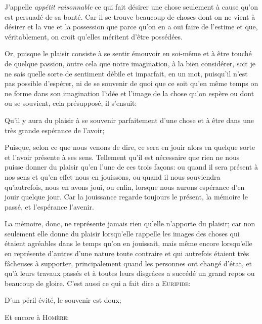 J'appelle \emph{appétit raisonnable} ce qui fait désirer une chose seulement à cause qu'on est persuadé de sa bonté.
Car il se trouve beaucoup de choses dont on ne vient à désirer et la vue et la possession que parce qu'on en a ouï
faire de l'estime et que, véritablement, on croit qu'elles méritent d'être possédées. 

\bigbreak

Or, puisque le plaisir consiste à se sentir émouvoir en soi-même et à être touché de quelque passion, outre cela
que notre imagination, à la bien considérer, soit je ne sais quelle sorte de sentiment débile et imparfait, en un
mot, puisqu'il n'est pas possible d'espérer, ni de se souvenir de quoi que ce soit qu'en même temps on ne forme
dans son imagination l'idée et l'image de la chose qu'on espère ou dont ou se souvient, cela présupposé, il
s'ensuit:

\begin{lieu}
	Qu'il y aura du plaisir à se souvenir parfaitement d'une chose et à être dans une très grande espérance de
	l'avoir;
\end{lieu}

Puisque, selon ce que nous venons de dire, ce sera en jouir alors en quelque sorte et l'avoir présente à ses
sens. Tellement qu'il est nécessaire que rien ne nous puisse donner du plaisir qu'en l'une de ces trois façons:
ou quand il sera présent à nos sens et qu'en effet nous en jouissons, ou quand il nous souviendra qu'autrefois,
nous en avons joui, ou enfin, lorsque nous aurons espérance d'en jouir quelque jour. Car la jouissance regarde
toujours le présent, la mémoire le passé, et l'espérance l'avenir.

\bigbreak

La mémoire, donc, ne représente jamais rien qu'elle n'apporte du plaisir; car non seulement elle donne du plaisir
lorsqu'elle rappelle les images des choses qui étaient agréables dans le temps qu'on en jouissait, mais même encore
lorsqu'elle en représente d'autres d'une nature toute contraire et qui autrefois étaient très fâcheuses à supporter,
principalement quand les personnes ont changé d'état, et qu'à leurs travaux passés et à toutes leurs disgrâces a
succédé un grand repos ou beaucoup de gloire. C'est aussi ce qui a fait dire a \textsc{Euripide}:

\begin{emphpar}
	D'un péril évité, le souvenir est doux;
\end{emphpar}

Et encore à \textsc{Homère}:

